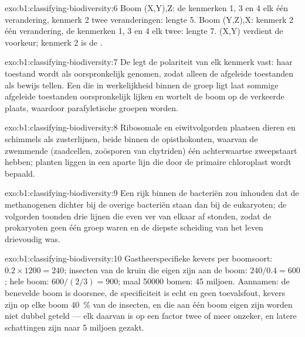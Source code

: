 \begin{solution}{exo:b1:classifying-biodiversity:6}
Boom (X,Y),Z: de kenmerken 1, 3 en 4 elk één verandering, kenmerk 2 twee
veranderingen: lengte 5. Boom (Y,Z),X: kenmerk 2 één verandering, de
kenmerken 1, 3 en 4 elk twee: lengte 7. (X,Y) verdient de voorkeur; kenmerk 2
is de .
\end{solution}

\begin{solution}{exo:b1:classifying-biodiversity:7}
De  legt de polariteit van elk kenmerk vast: haar toestand wordt
als oorspronkelijk genomen, zodat alleen de afgeleide toestanden als bewijs
tellen. Een  die in werkelijkheid binnen de groep ligt laat
sommige afgeleide toestanden oorspronkelijk lijken en wortelt de boom op de
verkeerde plaats, waardoor  parafyletische groepen worden.
\end{solution}

\begin{solution}{exo:b1:classifying-biodiversity:8}
Ribosomale en eiwitvolgorden plaatsen dieren en schimmels als zusterlijnen,
beide binnen de opisthokonten, waarvan de zwemmende  (zaadcellen,
zoösporen van chytriden) één achterwaartse zweepstaart hebben; planten liggen
in een aparte lijn die door de primaire chloroplast wordt bepaald.
\end{solution}

\begin{solution}{exo:b1:classifying-biodiversity:9}
Een rijk binnen de bacteriën zou inhouden dat de methanogenen dichter bij de
overige bacteriën staan dan bij de eukaryoten; de volgorden toonden drie
lijnen die even ver van elkaar af stonden, zodat de prokaryoten geen één
groep waren en de diepste scheiding van het leven drievoudig was.
\end{solution}

\begin{solution}{exo:b1:classifying-biodiversity:10}
Gastheerspecifieke kevers per boomsoort: $0.2\times 1200 = 240$; insecten van
de kruin die eigen zijn aan de boom: $240/0.4 = 600$; hele boom:
$600/(2/3) = 900$; maal \num{50000} bomen: \num{45} miljoen. Aannamen: de
benevelde boom is doorsnee, de specificiteit is echt en geen toevalsfout,
kevers zijn op elke boom \qty{40}{\%} van de insecten, en  die aan
één boom eigen zijn worden niet dubbel geteld --- elk daarvan is op een
factor twee of meer onzeker, en latere schattingen zijn naar \num{5} miljoen
gezakt.
\end{solution}


